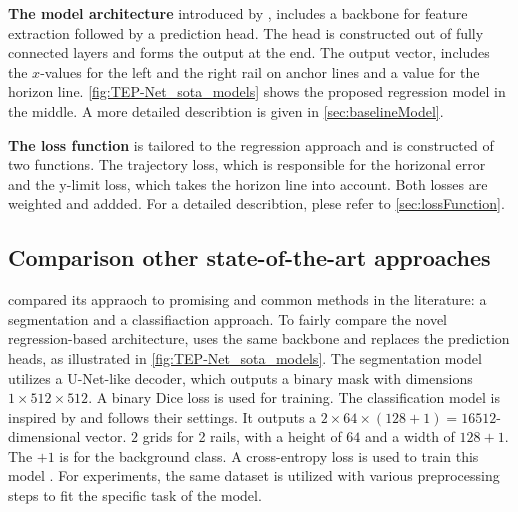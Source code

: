\vspace{1cm} %

\noindent \textbf{The model architecture} introduced by \cite{tepNet2024}, includes a backbone for feature extraction followed by a prediction head.
The head is constructed out of fully connected layers and forms the output at the end.
The output vector, includes the $x$-values for the left and the right rail on anchor lines and a value for the horizon line.
\autoref{fig:TEP-Net_sota_models} shows the proposed regression model in the middle.
A more detailed describtion is given in \autoref{sec:baselineModel}.

\vspace{1cm} %

\noindent \textbf{The loss function} is tailored to the regression approach and is constructed of two functions.
The trajectory loss, which is responsible for the horizonal error and the y-limit loss, which takes the horizon line into account.
Both losses are weighted and addded.
For a detailed describtion, plese refer to \autoref{sec:lossFunction}.

\subsection{Comparison other state-of-the-art approaches}

\cite{tepNet2024} compared its appraoch to promising and common methods in the literature: a segmentation and a classifiaction approach.
To fairly compare the novel regression-based architecture, \cite{tepNet2024} uses the same backbone and replaces the prediction heads, as illustrated in \autoref{fig:TEP-Net_sota_models}.
The segmentation model utilizes a U-Net-like \cite{uNet2015} decoder, which outputs a binary mask with dimensions $1 \times 512 \times 512$.
A binary Dice loss is used for training.
The classification model is inspired by \cite{li2022rail} and follows their settings.
It outputs a $2 \times 64 \times (128 + 1) = 16512$-dimensional vector.
$2$ grids for 2 rails, with a height of $64$ and a width of $128+1$.
The $+1$ is for the background class.
A cross-entropy loss is used to train this model \cite{tepNet2024}.
For experiments, the same dataset is utilized with various preprocessing steps to fit the specific task of the model.

